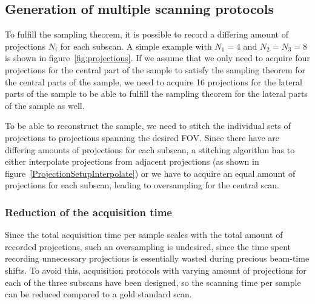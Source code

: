 \subsection{Generation of multiple scanning protocols}
\cbstart
To fulfill the sampling theorem, it is possible to record a differing amount of projections $N_{i}$ for each subscan. A simple example with $N_{1}=4$ and $N_{2}=N_{3}=8$ is shown in figure~\ref{fig:projections}. If we assume that we only need to acquire four projections for the central part of the sample to satisfy the sampling theorem for the central parts of the sample, we need to acquire 16 projections for the lateral parts of the sample to be able to fulfill the sampling theorem for the lateral parts of the sample as well.

To be able to reconstruct the sample, we need to stitch the individual sets of projections to projections spanning the desired FOV. Since there have are differing amounts of projections for each subscan, a stitching algorithm has to either interpolate projections from adjacent projections (as shown in figure~\ref{ProjectionSetupInterpolate}) or we have to acquire an equal amount of projections for each subscan, leading to oversampling for the central scan.

\begin{figure*}
	\centering
	\subfloat[]{%
		\label{subfig:ProjectionSetup}%
		}%
	\subfloat[]{%
		\label{subfig:ProjectionSetupInterpolate}%
		}%
	\caption{Setup with one central (green) and two lateral scans (red and blue, respectively). For demonstration purposes, the central scan has four projections and the lateral scans have eight projections each (all acquired over \SI{180}{\degree}). The colors of the three positions correspond to the colors shown in figure~\ref{subfig:scanning-possibilities}. : scanned projections, : scanned projections and additional interpolated projections (dashed) needed to correctly merge all projections.}
	\label{fig:projections}
\end{figure*}
\cbend

\subsubsection{Reduction of the acquisition time}
\cbstart
Since the total acquisition time per sample scales with the total amount of recorded projections, such an oversampling is undesired, since the time spent recording unnecessary projections is essentially wasted during precious beam-time shifts. To avoid this, acquisition protocols with varying amount of projections for each of the three subscans have been designed, so the scanning time per sample can be reduced compared to a gold standard scan.

